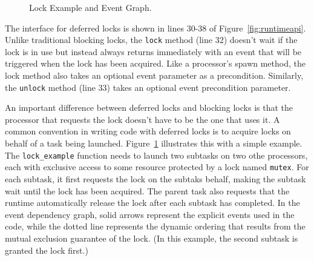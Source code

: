 \begin{figure}
{\begin{tikzpicture}



\end{tikzpicture}
}
\caption{Lock Example and Event Graph.\label{fig:lockevents}}
\vspace{-4mm}
\end{figure}

The interface for deferred locks is shown in lines 30-38 of Figure~\ref{fig:runtimeapi}.
Unlike traditional blocking locks, the {\tt lock} method (line 32) doesn't
wait if the lock is in use but instead always returns immediately with an event that will be triggered
when the lock has been acquired.  Like a processor's spawn method, the lock method also 
takes an optional event parameter as a precondition.  Similarly, the {\tt unlock} 
method (line 33) takes an optional event precondition parameter.

An important difference between deferred locks and blocking locks is that the processor
that requests the lock doesn't have to be the one that uses it.  A common
convention in writing code with deferred locks is to acquire locks on behalf of a task being
launched.  Figure~\ref{fig:lockevents} illustrates this with a simple example.  The {\tt lock\_example}
function needs to launch two subtasks on two othe processors, each with exclusive access to some resource protected by a
lock named {\tt mutex}.  For each subtask, it first requests the lock on the subtaks behalf, making the
subtask wait until the lock has been acquired.  The parent task also requests that the runtime automatically
release the lock after each subtask has completed.  In the event dependency graph, solid arrows represent
the explicit events used in the code, while the dotted line represents the dynamic ordering that results
from the mutual exclusion guarantee of the lock.  (In this example, the second subtask is granted the lock first.)

